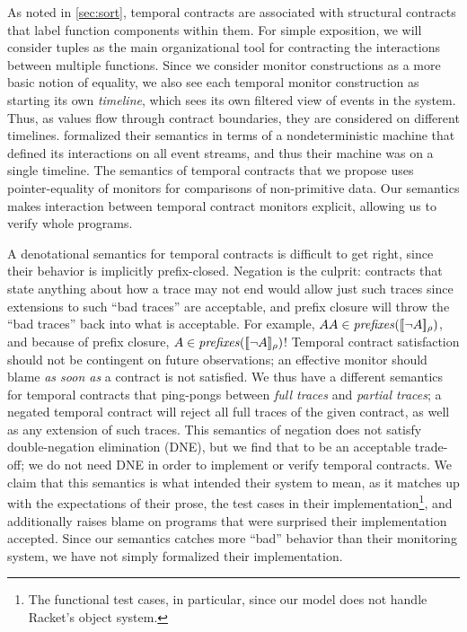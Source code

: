 %
As noted in \autoref{sec:sort}, temporal contracts are associated with structural contracts that label function components within them.
%
For simple exposition, we will consider tuples as the main organizational tool for contracting the interactions between multiple functions.
%
Since we consider monitor constructions as a more basic notion of equality, we also see each temporal monitor construction as starting its own \emph{timeline}, which sees its own filtered view of events in the system.
%
Thus, as values flow through contract boundaries, they are considered on different timelines.
%
\dfm formalized their semantics in terms of a nondeterministic machine that defined its interactions on all event streams, and thus their machine was on a single timeline.
%
The semantics of temporal contracts that we propose uses pointer-equality of monitors for comparisons of non-primitive data.
%
Our semantics makes interaction between temporal contract monitors explicit, allowing us to verify whole programs.

A denotational semantics for temporal contracts is difficult to get right, since their behavior is implicitly prefix-closed.
%
Negation is the culprit: contracts that state anything about how a trace may not end would allow just such traces since extensions to such ``bad traces'' are acceptable, and prefix closure will throw the ``bad traces'' back into what is acceptable.
%
%
For example, $AA \in \mathit{prefixes}([\![ \neg A ]\!]_{\rho})$, and because of prefix closure, $A \in \mathit{prefixes}([\![ \neg A ]\!]_{\rho})$!
%
Temporal contract satisfaction should not be contingent on future observations; an effective monitor should blame \emph{as soon as} a contract is not satisfied.
%
We thus have a different semantics for temporal contracts that ping-pongs between \emph{full traces} and \emph{partial traces}; a negated temporal contract will reject all full traces of the given contract, as well as any extension of such traces.
%
This semantics of negation does not satisfy double-negation elimination (DNE), but we find that to be an acceptable trade-off; we do not need DNE in order to implement or verify temporal contracts.
%
We claim that this semantics is what \dfm intended their system to mean, as it matches up with the expectations of their prose, the test cases in their implementation\footnote{The functional test cases, in particular, since our model does not handle Racket's object system.}, and additionally raises blame on programs that \dfm were surprised their implementation accepted.
%
Since our semantics catches more ``bad'' behavior than their monitoring system, we have not simply formalized their implementation.

